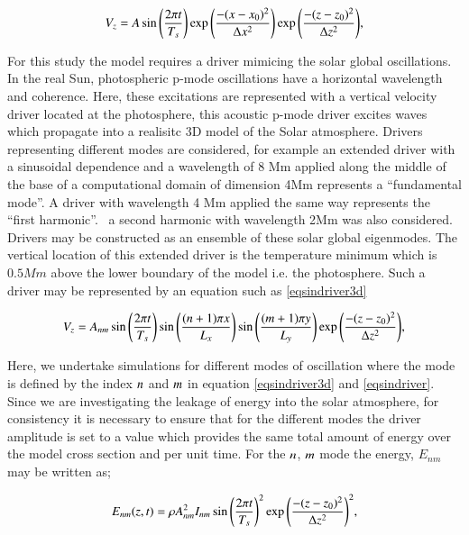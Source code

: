 \documentclass{aa}
\begin{document}
\begin{equation}\label{eqpointdriver}
V_{z}=A \sin{\left({2\pi t}\over{T_s} \right)  }  \exp{\left( -{(x-x_0)^{2}}\over{\Delta x^{2}} \right) } \exp{\left( -{(z-z_0)^{2}}\over{\Delta z^{2}} \right) },
\end{equation}

For this study the model requires a driver mimicing the solar global oscillations.    In the real Sun, photospheric p-mode oscillations have a horizontal wavelength and coherence. Here, these excitations are represented with a vertical velocity driver located at the photosphere, this acoustic p-mode driver excites waves which propagate into a realisitc 3D model of the Solar atmosphere. Drivers representing different modes are considered, for example  an extended driver with a sinusoidal dependence and a wavelength of 8 Mm applied along the middle of the base of a computational domain of dimension 4Mm represents  a “fundamental mode”. A driver with wavelength 4 Mm applied the same way represents the “first harmonic”.  \ a second harmonic with wavelength 2Mm was also considered. Drivers may be constructed as an ensemble of these solar global eigenmodes.  The vertical location of this extended driver is the temperature minimum which is $0.5Mm$ above the lower boundary of the model i.e. the photosphere. Such a driver may be represented by an equation such as  \eqref{eqsindriver3d}

\begin{equation}\label{eqsindriver3d}
V_{z}=A_{nm} \sin{\left({2\pi t}\over{T_s} \right)  }\sin{\left(  {(n+1)\pi x}\over{L_x} \right)}   \sin{\left(  {(m+1)\pi y}\over{L_y} \right)}    \exp{\left( -{(z-z_0)^{2}}\over{\Delta z^{2}} \right) },
\end{equation}

Here, we undertake simulations for different modes of oscillation where the mode is defined by the index $\it{n}$ and $\it{m}$ in equation \eqref{eqsindriver3d} and \eqref{eqsindriver}. Since we are investigating the leakage of energy into the solar atmosphere, for consistency it is necessary to ensure that for the different modes the driver amplitude is set to a value which provides the same total amount of energy over the model cross section and per unit time. For the $\it{n}$, $\it{m}$ mode the energy, $E_{nm}$ may be written as;

\begin{equation}\label{eqdriverenergy}
E_{nm}(z,t)= \rho A_{nm}^{2} I_{nm}  \sin{\left({2\pi t}\over{T_s} \right)  }^{2}    \exp{\left( -{(z-z_0)^{2}}\over{\Delta z^{2}} \right) }^{2},
\end{equation}
\end{document}
